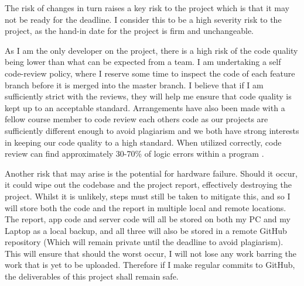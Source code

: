 The risk of changes in turn raises a key risk to the project which is that it may not be ready for the deadline. 
I consider this to be a high severity risk to the project, as the hand-in date for the project is firm and unchangeable. 

As I am the only developer on the project, there is a high risk of the code quality being lower than what can be expected from a team.
I am undertaking a self code-review policy, where I reserve some time to inspect the code of each feature branch before it is merged into the master branch.
I believe that if I am sufficiently strict with the reviews, they will help me ensure that code quality is kept up to an acceptable standard.
Arrangements have also been made with a fellow course member to code review each others code as our projects are sufficiently different enough to avoid plagiarism and we both have strong interests in keeping our code quality to a high standard.
When utilized correctly, code review can find approximately 30-70\% of logic errors within a program \citep{myers2011art}.

Another risk that may arise is the potential for hardware failure. 
Should it occur, it could wipe out the codebase and the project report, effectively destroying the project. 
Whilst it is unlikely, steps must still be taken to mitigate this, and so I will store both the code and the report in multiple local and remote locations.
The report, app code and server code will all be stored on both my PC and my Laptop as a local backup, and all three will also be stored in a remote GitHub repository (Which will remain private until the deadline to avoid plagiarism).
This will ensure that should the worst occur, I will not lose any work barring the work that is yet to be uploaded.
Therefore if I make regular commits to GitHub, the deliverables of this project shall remain safe. 